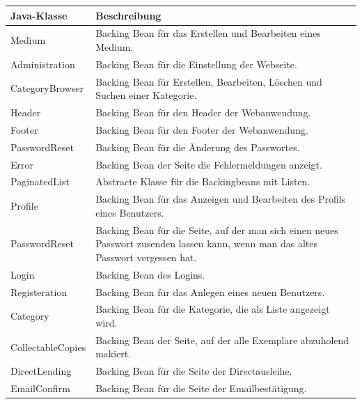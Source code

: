 \documentclass{article}
\begin{document}
\begin{center}
    \begin{table}
        \begin{tabular} { |p{}|p{}| }
            \hline
            Java-Klasse & Beschreibung  \\
            \hline\hline
            Medium & Backing Bean für das Erstellen und Bearbeiten eines Medium.\\
            \hline
            Administration & Backing Bean für die Einstellung der Webseite.\\
            \hline
            CategoryBrowser & Backing Bean für Erstellen, Bearbeiten, Löschen und Suchen einer Kategorie.\\
            \hline
            Header & Backing Bean für den Header der Webanwendung. \\
            \hline
            Footer & Backing Bean für den Footer der Webanwendung. \\
            \hline
            PasswordReset & Backing Bean für die Änderung des Passwortes.\\
            \hline
            Error & Backing Bean der Seite die Fehlermeldungen anzeigt.\\
            \hline
            PaginatedList & Abstracte Klasse für die Backingbeans mit Listen.\\
            \hline
            Profile & Backing Bean für das Anzeigen und Bearbeiten des Profils eines Benutzers. \\
            \hline
            PasswordReset & Backing Bean für die Seite, auf der man sich einen neues Passwort zusenden lassen kann, wenn man das altes Passwort vergessen hat.\\
            \hline
            Login & Backing Bean des Logins.\\
            \hline
            Registeration & Backing Bean für das Anlegen eines neuen Benutzers.\\
            \hline
            Category & Backing Bean für die Kategorie, die als Liste angezeigt wird.\\
            \hline
            CollectableCopies & Backing Bean der Seite, auf der alle Exemplare abzuholend makiert. \\
            \hline
            DirectLending & Backing Bean für die Seite der Directausleihe.\\
            \hline
            EmailConfirm & Backing Bean für die Seite der Emailbestätigung.\\

\end{tabular}
\end{table}
\end{center}
\end{document}
